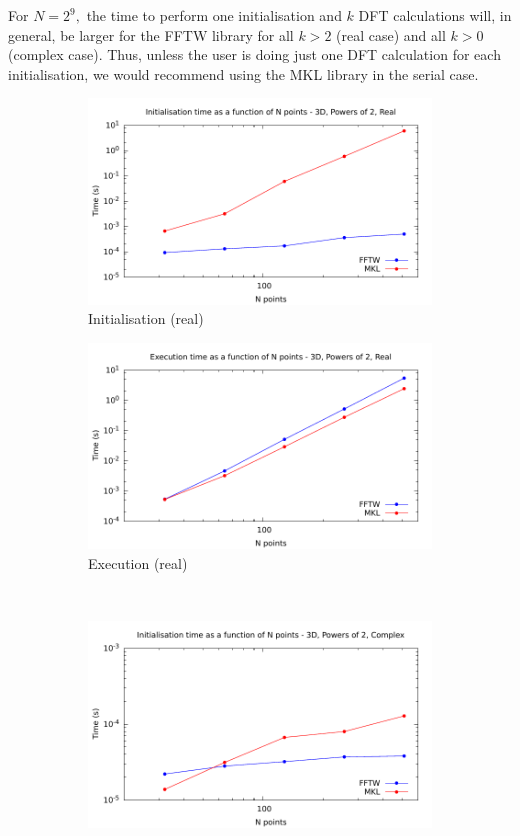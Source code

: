 \documentclass[12pt, a4paper]{article} \setlength{\textheight}{24cm}
\begin{document}
For $N=2^9,$ the time to perform one initialisation and $k$ DFT
calculations will, in general, be larger for the FFTW library for all
$k>2$ (real case) and all $k>0$ (complex case). Thus, unless the user
is doing just one DFT calculation for each initialisation, we would
recommend using the MKL library in the serial case.

\begin{figure}[H]
  \captionsetup{width=0.8\linewidth}
  \centering
  \begin{subfigure}{.5\textwidth}
    \centering
    \includegraphics[width=.9\linewidth]{graphs/3d-pow2-init-r.pdf}
    \caption{Initialisation (real)}
    \label{3DPOW2RI}
  \end{subfigure}%
  \begin{subfigure}{.5\textwidth}
    \centering
    \includegraphics[width=.9\linewidth]{graphs/3d-pow2-exec-r.pdf}
    \caption{Execution (real)}
    \label{3DPOW2R}
  \end{subfigure}\\
  \begin{subfigure}{.5\textwidth}
    \centering
    \includegraphics[width=.9\linewidth]{graphs/3d-pow2-init-c.pdf}

\end{subfigure}
\end{figure}
\end{document}
